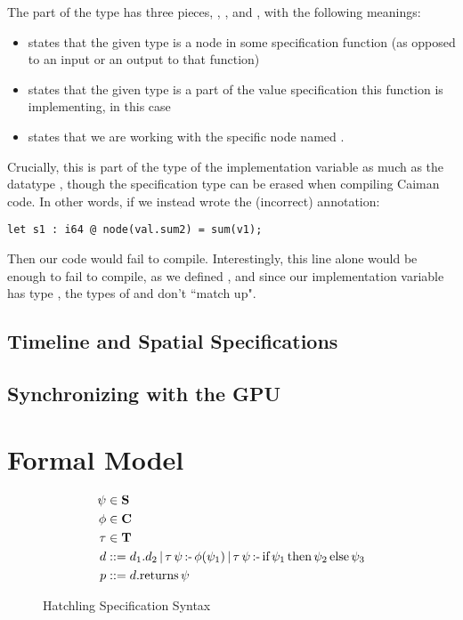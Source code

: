 The part of the type  has three pieces, , , and , with the following meanings:
%
\begin{itemize}
\item {} states that the given type is a node in some specification function (as opposed to an input or an output to that function)
\item {} states that the given type is a part of the value specification this function is implementing,  in this case
\item {} states that we are working with the specific node named .
\end{itemize}
%
Crucially, this is part of the type of the implementation variable as much as the datatype , though the specification type can be erased when compiling Caiman code.  In other words, if we instead wrote the (incorrect) annotation:
%
\begin{lstlisting}
let s1 : i64 @ node(val.sum2) = sum(v1);
\end{lstlisting}
%
Then our code would fail to compile.  Interestingly, this line alone would be enough to fail to compile, as we defined , and since our implementation variable  has type , the types of  and  don't ``match up".
\subsection{Timeline and Spatial Specifications}
\label{subsec:spec}

\subsection{Synchronizing with the GPU}
\label{subsec:sync}

\section{Formal Model}
\label{sec:formal}

\begin{figure}
\begin{align*}
	\psi &\in \textbf{S}\\
	\phi &\in \textbf{C}\\
	\tau &\in \textbf{T} \\
    d &\mathrel{::=} d_1.d_2 \,|\,
        \tau\,\psi\,\textrm{:-}\, \phi(\psi_1) \,|\,
        \tau\,\psi\,\textrm{:-}\, \textrm{if}\, \psi_1 \,\textrm{then}\, \psi_2 \,\textrm{else}\, \psi_3 
        \\
    p &\mathrel{::=} d.\textrm{returns}\, \psi
\end{align*}
\caption{Hatchling Specification Syntax}
\label{fig:hatchspecsyntax}
\end{figure}

